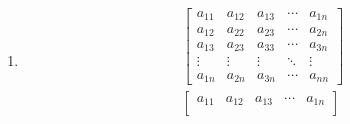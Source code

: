 \documentclass[12pt, letterpaper]{article}
\begin{document}
\begin{enumerate}
\begin{enumerate}[(a)]
\begin{align*}
                x_1 &= \frac12(\frac{43}{2}) - \frac12(-\frac{23}{42}) \\
                    &= \frac{463}{42}
            \end{align*}
            \begin{align*}
                A\vec x &= \vec b \\
                \begin{bmatrix}
                    -2 & 0 & 1 &-1 \\
                    -1 & 2 & 0 & 1 \\
                    4 & -1 & -2 &-4 \\
                    0 & 0 & 2 & 0
                \end{bmatrix} 
                \begin{bmatrix}
                        \frac{463}{42} \\
                        \frac{44}{7} \\
                        \frac{43}{2} \\
                        -\frac{23}{42}
                \end{bmatrix}
                &= 
                \begin{bmatrix}
                        0 \\
                        1 \\
                        2 \\
                        3
                \end{bmatrix}
            \end{align*}
        \end{enumerate}
    \item %
        \begin{align*}
            \begin{bmatrix}
                a_{11} & a_{12} & a_{13} & \cdots & a_{1n} \\
                a_{12} & a_{22} & a_{23} & \cdots & a_{2n} \\
                a_{13} & a_{23} & a_{33} & \cdots & a_{3n} \\
                \vdots & \vdots & \vdots & \ddots & \vdots \\
                a_{1n} & a_{2n} & a_{3n} & \cdots & a_{nn}
            \end{bmatrix} \\
            \begin{bmatrix}
                a_{11} & a_{12} & a_{13} & \cdots & a_{1n} \\

\end{bmatrix}
\end{align*}
\end{enumerate}
\end{document}
